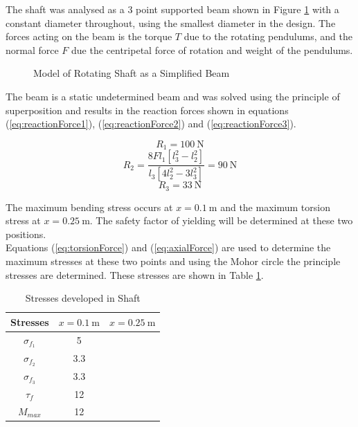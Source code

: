 The shaft was analysed as a 3 point supported beam shown in Figure \ref{fig:supp_beam} with a constant diameter throughout, using the smallest diameter in the design. The forces acting on the beam is the torque $T$ due to the rotating pendulums, and the normal force $F$ due the centripetal force of rotation and weight of the pendulums.\\


\begin{figure}[h]
	\centering
	
	\caption{Model of Rotating Shaft as a Simplified Beam}
	\label{fig:supp_beam}
\end{figure}

The beam is a static undetermined beam and was solved using the principle of superposition and results in the reaction forces shown in equations (\ref{eq:reactionForce1}), (\ref{eq:reactionForce2}) and (\ref{eq:reactionForce3}).

\begin{equation} \label{eq:reactionForce1}
R_{1} = \SI{100}{\newton}
\end{equation}
\begin{equation} \label{eq:reactionForce2}
R_{2} = \frac{ 8Fl_{1}[l_{3}^2 - l_{2}^2] }{l_{3}[4l_{2}^2-3l_{3}^2] } = \SI{90}{\newton}
\end{equation}
\begin{equation} \label{eq:reactionForce3}
R_{3} = \SI{33}{\newton}
\end{equation}

The maximum bending stress occurs at $x=\SI{0.1}{\meter}$ and the maximum torsion stress at $x=\SI{0.25}{\meter}$. The safety factor of yielding will be determined at these two positions.\\

Equations (\ref{eq:torsionForce}) and (\ref{eq:axialForce}) are used to determine the maximum stresses at these two points and using the Mohor circle the principle stresses are determined.  These stresses are shown in Table \ref{table:stresses}.\\


\begin{table}[]
	\centering
	\begin{tabular}{|c|c|c|}
		\hline
		Stresses & $x = \SI{0.1}{\meter}$ & $x=\SI{0.25}{\meter}$ \\
		\hline
		\hline
		$\sigma_{f_{1}}$ & \SI{5}{} & \\
		\hline
		$\sigma_{f_{2}}$ & \SI{3.3}{}& \\
		\hline
		$\sigma_{f_{3}}$ & \SI{3.3}{}& \\
		\hline
		$\tau_{f}$ & \SI{12}{}&  \\
		\hline
		$M_{max}$ & \SI{12}{}& \\
		\hline
	\end{tabular}
	\caption{Stresses developed in Shaft}
	\label{table:stresses}
\end{table}

